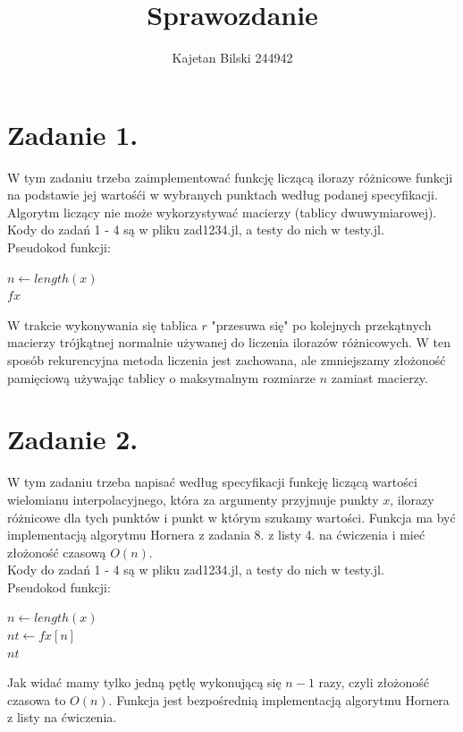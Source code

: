 \documentclass{article}
\title{Sprawozdanie}
\author{Kajetan Bilski 244942}
\begin{document}
	\maketitle

\section{Zadanie 1.}
W tym zadaniu trzeba zaimplementować funkcję liczącą ilorazy różnicowe funkcji na podstawie jej wartośći w wybranych punktach według podanej specyfikacji. Algorytm liczący nie może wykorzystywać macierzy (tablicy dwuwymiarowej).\\
Kody do zadań 1 - 4 są w pliku zad1234.jl, a testy do nich w testy.jl.\\
Pseudokod funkcji:\\
\begin{algorithm}[H]
$n \leftarrow length(x)$\\
\KwRet $fx$\\
\end{algorithm}
W trakcie wykonywania się tablica $r$ "przesuwa się" po kolejnych przekątnych macierzy trójkątnej normalnie używanej do liczenia ilorazów różnicowych. W ten sposób rekurencyjna metoda liczenia jest zachowana, ale zmniejszamy złożoność pamięciową używając tablicy o maksymalnym rozmiarze $n$ zamiast macierzy.
\section{Zadanie 2.}
W tym zadaniu trzeba napisać według specyfikacji funkcję liczącą wartości wielomianu interpolacyjnego, która za argumenty przyjmuje punkty $x$, ilorazy różnicowe dla tych punktów i punkt w którym szukamy wartości. Funkcja ma być implementacją algorytmu Hornera z zadania 8. z listy 4. na ćwiczenia i mieć złożoność czasową $O(n)$.\\
Kody do zadań 1 - 4 są w pliku zad1234.jl, a testy do nich w testy.jl.\\
Pseudokod funkcji:\\
\begin{algorithm}[H]
$n \leftarrow length(x)$\\
$nt\leftarrow fx[n]$\\
\KwRet $nt$
\end{algorithm}
Jak widać mamy tylko jedną pętlę wykonującą się $n-1$ razy, czyli złożoność czasowa to $O(n)$. Funkcja jest bezpośrednią implementacją algorytmu Hornera z listy na ćwiczenia.
\end{document}
